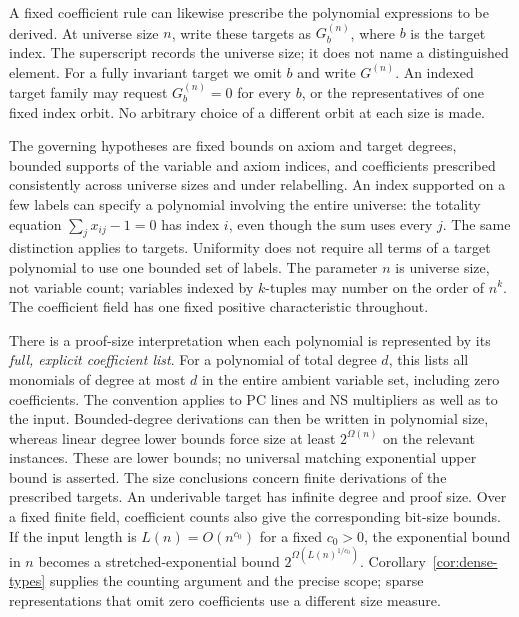 \documentclass[11pt,a4paper]{article}
\theoremstyle{definition}\newtheorem{definition}[theorem]{Definition}
\theoremstyle{remark}\newtheorem{remark}[theorem]{Remark}
\begin{document}
A fixed coefficient rule can likewise prescribe the polynomial
expressions to be derived. At universe size $n$, write these targets as
$G_b^{(n)}$, where $b$ is the target index. The superscript records the
universe size; it does not name a distinguished element. For a fully
invariant target we omit $b$ and write $G^{(n)}$. An indexed target family
may request $G_b^{(n)}=0$ for every $b$, or the representatives of one
fixed index orbit. No arbitrary choice of a different orbit at each
size is made.

The governing hypotheses are fixed bounds on axiom and target degrees,
bounded supports of the
variable and axiom indices, and coefficients prescribed consistently
across universe sizes and under relabelling. An index supported on a
few labels can specify a polynomial involving the entire universe:
the totality equation $\sum_j x_{ij}-1=0$ has index $i$, even though
the sum uses every $j$. The same distinction applies to targets.
Uniformity does not require all terms of a target polynomial to use
one bounded set of labels. The parameter $n$ is universe size, not
variable count; variables indexed by $k$-tuples may number on the
order of $n^k$. The coefficient field has one fixed positive
characteristic throughout.

There is a proof-size interpretation when each polynomial is represented
by its \emph{full, explicit coefficient list}. For a polynomial of
total degree $d$, this lists all monomials of degree at most $d$ in
the entire ambient variable set, including zero coefficients. The
convention applies to PC lines and NS multipliers as well as to the
input. Bounded-degree derivations can then be written in polynomial
size, whereas linear degree lower bounds force size at least
$2^{\Omega(n)}$ on the relevant instances. These are lower bounds;
no universal matching exponential upper bound is asserted. The size
conclusions concern finite derivations of the prescribed targets.
An underivable target has infinite degree and proof size. Over a fixed
finite field, coefficient counts also give the corresponding bit-size
bounds. If the input length is $L(n)=O(n^{c_0})$ for a fixed $c_0>0$, the exponential bound in
$n$ becomes a stretched-exponential bound
$2^{\Omega(L(n)^{1/c_0})}$. Corollary~\ref{cor:dense-types} supplies the
counting argument and the precise scope; sparse representations that
omit zero coefficients use a different size measure.
\end{document}

